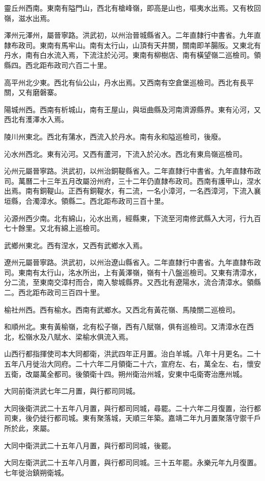 靈丘州西南。東南有隘門山，西北有槍峰嶺，即高是山也，嘔夷水出焉。又有枚回嶺，滋水出焉。

澤州元澤州，屬晉寧路。洪武初，以州治晉城縣省入。二年直隸行中書省。九年直隸布政司。東南有馬牢山。南有太行山，山頂有天井關，關南即羊腸阪。又東北有丹水，南有白水流入焉，下流注於沁河。東南有柳樹店、南有橫望嶺二巡檢司。領縣四。西北距布政司六百二十里。

高平州北少東。西北有仙公山，丹水出焉。又西南有空倉堡巡檢司。西北有長平關，又有磨磐寨。

陽城州西。西南有析城山，南有王屋山，與垣曲縣及河南濟源縣界。東有沁河，又西北有濩澤水入焉。

陵川州東北。西北有蒲水，西流入於丹水。南有永和隘巡檢司，後廢。

沁水州西北。東有沁河。又西有蘆河，下流入於沁水。西北有東烏嶺巡檢司。

沁州元屬晉寧路。洪武初，以州治銅鞮縣省入。二年直隸行中書省。九年直隸布政司。萬曆二十三年五月改屬汾州府，三十二年仍直隸布政司。西南有護甲山，涅水出焉。南有銅鞮山。正西有銅鞮水，有二流，一名小漳河，一名西漳河，下流入襄垣縣，合濁漳水。領縣二。西北距布政司三百十里。

沁源州西少南。北有綿山，沁水出焉，經縣東，下流至河南修武縣入大河，行九百七十餘里。又北有綿上巡檢司。

武鄉州東北。西有涅水，又西有武鄉水入焉。

遼州元屬晉寧路。洪武初，以州治遼山縣省入。二年直隸行中書省。九年直隸布政司。東南有太行山，洺水所出，上有黃澤嶺，嶺有十八盤巡檢司。又東有清漳水，分二流，至東南交漳村而合，南入黎城縣界。又西北有遼陽水，流合清漳水。領縣二。西北距布政司三百四十里。

榆社州西。西有榆水。西南有武鄉水。又西北有黃花嶺、馬陵關二巡檢司。

和順州北。東有黃榆嶺，北有松子嶺，西有八賦嶺，俱有巡檢司。又清漳水在西北，松嶺水及八賦水、梁榆水俱流入焉。

山西行都指揮使司本大同都衛，洪武四年正月置。治白羊城。八年十月更名。二十五年八月徙治大同府。二十六年二月領衛二十六，宣府左、右，萬全左、右，懷安五衛，改屬萬全都司。後領衛十四。朔州衛治州城，安東中屯衛寄治應州城。

大同前衛洪武七年二月置，與行都司同城。

大同後衛洪武二十五年八月置，與行都司同城，尋罷。二十六年二月復置，治行都司東，後仍徙行都司城。東有聚落城，天順三年築。嘉靖二年九月置聚落守禦千戶所於此，來屬。

大同中衛洪武二十五年八月置，與行都司同城，後罷。

大同左衛洪武二十五年八月置，與行都司同城。三十五年罷。永樂元年九月復置。七年徙治鎮朔衛城。

